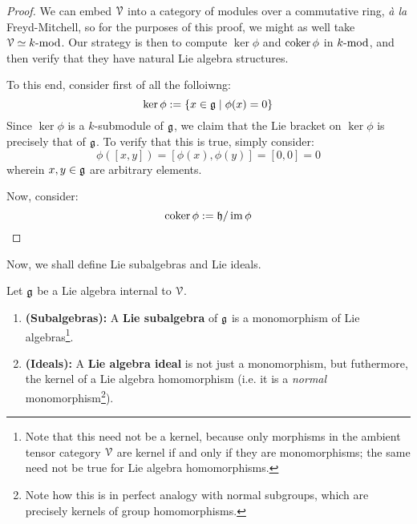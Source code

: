                 \begin{proof}
                    We can embed $\calV$ into a category of modules over a commutative ring, \textit{\`a la} Freyd-Mitchell, so for the purposes of this proof, we might as well take $\calV \cong k\mod$. Our strategy is then to compute $\ker \phi$ and $\coker \phi$ in $k\mod$, and then verify that they have natural Lie algebra structures. 
                    
                    To this end, consider first of all the folloiwng:
                        $$\ker \phi := \{x \in \g \mid \phi(x) = 0\}$$
                    Since $\ker \phi$ is a $k$-submodule of $\g$, we claim that the Lie bracket on $\ker \phi$ is precisely that of $\g$. To verify that this is true, simply consider:
                        $$\phi([x, y]) = [\phi(x), \phi(y)] = [0, 0] = 0$$
                    wherein $x, y \in \g$ are arbitrary elements. 
                    
                    Now, consider:
                        $$\coker \phi := \h/\im\phi$$
                \end{proof}
            
            Now, we shall define Lie subalgebras and Lie ideals. 
            \begin{definition} \label{def: lie_subalgebras_and_lie_ideals}
                Let $\g$ be a Lie algebra internal to $\calV$. 
                    \begin{enumerate}
                        \item \textbf{(Subalgebras):} A \textbf{Lie subalgebra} of $\g$ is a monomorphism of Lie algebras\footnote{Note that this need not be a kernel, because only  morphisms in the ambient tensor category $\calV$ are kernel if and only if they are monomorphisms; the same need not be true for Lie algebra homomorphisms.}.
                        \item \textbf{(Ideals):} A \textbf{Lie algebra ideal} is not just a monomorphism, but futhermore, the kernel of a Lie algebra homomorphism (i.e. it is a \textit{normal} monomorphism\footnote{Note how this is in perfect analogy with normal subgroups, which are precisely kernels of group homomorphisms.}). 
                    \end{enumerate}
            \end{definition}
        
